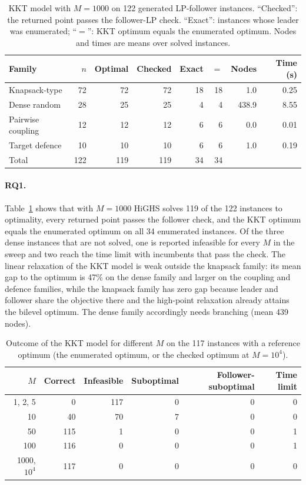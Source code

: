\documentclass[11pt]{article}
\begin{document}
\begin{table}[t]
\centering
\caption{KKT model with $M = 1000$ on 122 generated LP-follower instances.
``Checked'': the returned point passes the follower-LP check. ``Exact'':
instances whose leader was enumerated; ``$=$'': KKT optimum equals the
enumerated optimum. Nodes and times are means over solved instances.}
\label{tab:rq1}
\begin{tabular}{lrrrrrrr}
\toprule
Family & $n$ & Optimal & Checked & Exact & $=$ & Nodes & Time (s) \\
\midrule
Knapsack-type      & 72 & 72 & 72 & 18 & 18 & 1.0 & 0.25 \\
Dense random       & 28 & 25 & 25 &  4 &  4 & 438.9 & 8.55 \\
Pairwise coupling  & 12 & 12 & 12 &  6 &  6 & 0.0 & 0.01 \\
Target defence     & 10 & 10 & 10 &  6 &  6 & 1.0 & 0.19 \\
\midrule
Total & 122 & 119 & 119 & 34 & 34 & & \\
\bottomrule
\end{tabular}
\end{table}

\paragraph{RQ1.} Table~\ref{tab:rq1} shows that with $M = 1000$ HiGHS solves
119 of the 122 instances to optimality, every returned point passes the
follower check, and the KKT optimum equals the enumerated optimum on all 34
enumerated instances. Of the three dense instances that are not solved, one
is reported infeasible for every $M$ in the sweep and two reach the time
limit with incumbents that pass the check. The linear relaxation of the KKT
model is weak outside the knapsack family: its mean gap to the optimum is
47\% on the dense family and larger on the coupling and defence families,
while the knapsack family has zero gap because leader and follower share the
objective there and the high-point relaxation already attains the bilevel
optimum. The dense family accordingly needs branching (mean 439 nodes).

\begin{table}[t]
\centering
\caption{Outcome of the KKT model for different $M$ on the 117 instances
with a reference optimum (the enumerated optimum, or the checked optimum at
$M = 10^4$).}
\label{tab:rq2}
\begin{tabular}{rrrrrr}
\toprule
$M$ & Correct & Infeasible & Suboptimal & Follower-suboptimal & Time limit \\
\midrule
1, 2, 5  &   0 & 117 & 0 & 0 & 0 \\
10       &  40 &  70 & 7 & 0 & 0 \\
50       & 115 &   1 & 0 & 0 & 1 \\
100      & 116 &   0 & 0 & 0 & 1 \\
1000, $10^4$ & 117 & 0 & 0 & 0 & 0 \\
\bottomrule
\end{tabular}
\end{table}
\end{document}
